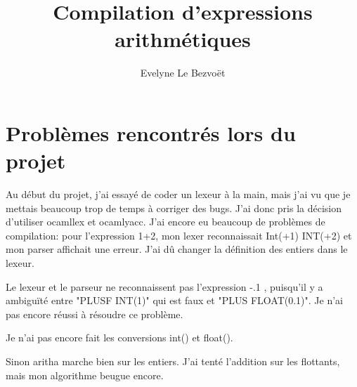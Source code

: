 \documentclass{article}
\title{Compilation d’expressions arithmétiques}
\author{Evelyne Le Bezvoët}
\begin{document}
\maketitle


\section{Problèmes rencontrés lors du projet}

Au début du projet, j'ai essayé de coder un lexeur à la main, mais j'ai vu que je mettais beaucoup trop de temps à corriger des bugs. J'ai donc pris la décision d'utiliser ocamllex et ocamlyacc. J'ai encore eu beaucoup de problèmes de compilation: pour l'expression 1+2, mon lexer reconnaissait Int(+1) INT(+2) et mon parser affichait une erreur. J'ai dû changer la définition des entiers dans le lexeur.

Le lexeur et le parseur ne reconnaissent pas l'expression -.1 , puisqu'il y a ambiguïté entre "PLUSF INT(1)" qui est faux et "PLUS FLOAT(0.1)". Je n'ai pas encore réussi à résoudre ce problème.

Je n'ai pas encore fait les conversions int() et float().

Sinon aritha marche bien sur les entiers.
J'ai tenté l'addition sur les flottants, mais mon algorithme beugue encore.
\end{document}

